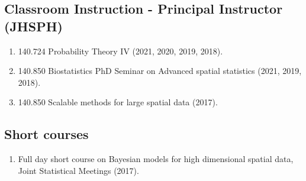 \documentclass[12pt]{article}
\newcommand{\mydot}[1]{\begin{enumerate}[label=$\circ$,leftmargin=\parindent]\setlength{\itemsep}{#1}}
\newcommand{\ee}{\end{enumerate}}
\newcommand{\mylift}[1]{\vspace*{#1}}
\begin{document}
\subsection*{Classroom Instruction - Principal Instructor (JHSPH)}
\mydot{-0.1em}
\item 140.724 Probability Theory IV (2021, 2020, 2019, 2018).
\item 140.850 Biostatistics PhD Seminar on Advanced spatial statistics (2021, 2019, 2018). 
\item 140.850 Scalable methods for large spatial data (2017).

\ee

%
%
%

\mylift{-1.5em}

\subsection*{Short courses}

\mydot{-0.1em}

\mylift{-1.em} \item Full day short course on Bayesian models for high dimensional spatial data, Joint Statistical Meetings (2017). 

\ee
\end{document}

